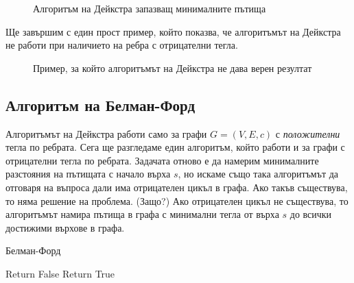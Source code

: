 \begin{figure}[!htbp]
  
  \caption{Алгоритъм на Дейкстра запазващ минималните пътища}
  \label{fig:dijkstra-graph}
\end{figure}


Ще завършим с един прост пример, който показва, че алгоритъмът на Дейкстра не работи
при наличието на ребра с отрицателни тегла.

\begin{figure}[!htbp]
    \caption{Пример, за който алгоритъмът на Дейкстра не дава верен резултат}
\end{figure}

\newpage
\subsection{Алгоритъм на Белман-Форд}

Алгоритъмът на Дейкстра работи само за графи $G = (V,E,c)$ с {\em положителни} тегла по ребрата.
Сега ще разгледаме един алгоритъм, който работи и за графи с отрицателни тегла по ребрата.
Задачата отново е да намерим минималните разстояния на пътищата с начало върха $s$, но
искаме също така алгоритъмът да отговаря на въпроса дали има отрицателен цикъл в графа. 
Ако такъв съществува, то няма решение на проблема. (Защо?)
Ако отрицателен цикъл не съществува, то алгоритъмът намира пътища в графа с минимални тегла от върха $s$
до всички достижими върхове в графа.


\begin{algorithm}
  \caption{Белман-Форд}
  \label{alg:belman-ford}
  
  \begin{algorithmic}[1]
    \State{}
    \State{}
    \EndFor
    \EndFor
    
    \State Return False
    \EndIf
    \EndFor
    \State Return True
    \EndProcedure
  \end{algorithmic}
\end{algorithm}

